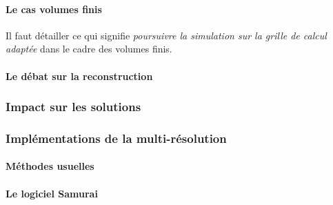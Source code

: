     \paragraph{Le cas volumes finis}
            Il faut détailler ce qui signifie \textit{poursuivre la simulation sur la grille de calcul adaptée} dans le cadre des volumes finis.

    \paragraph{Le débat sur la reconstruction}
\subsubsection{Impact sur les solutions}
    \paragraph{}
    \paragraph{}
\subsubsection{Implémentations de la multi-résolution}
    \paragraph{Méthodes usuelles}
    \paragraph{Le logiciel Samurai}